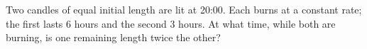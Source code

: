 Two candles of equal initial length are lit at 20:00. Each burns at a constant rate; the first lasts 6 hours and the second 3 hours. At what time, while both are burning, is one remaining length twice the other?
